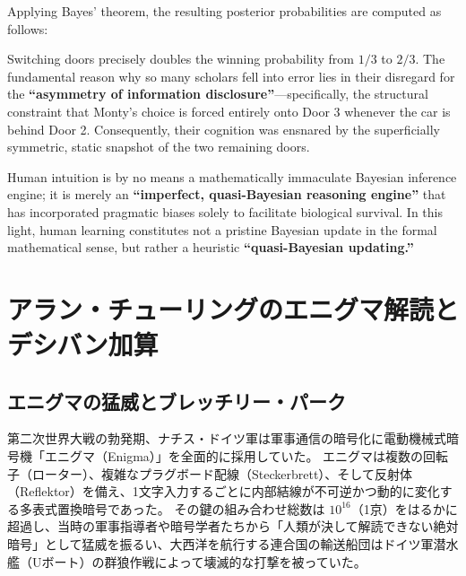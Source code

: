     

    Applying Bayes' theorem, the resulting posterior probabilities are computed as follows:

    

    Switching doors precisely doubles the winning probability from $1/3$ to $2/3$.
    The fundamental reason why so many scholars fell into error lies in their disregard for the \textbf{``asymmetry of information disclosure''}—specifically, the structural constraint that Monty's choice is forced entirely onto Door 3 whenever the car is behind Door 2. Consequently, their cognition was ensnared by the superficially symmetric, static snapshot of the two remaining doors.

    Human intuition is by no means a mathematically immaculate Bayesian inference engine; it is merely an \textbf{``imperfect, quasi-Bayesian reasoning engine''} that has incorporated pragmatic biases solely to facilitate biological survival. In this light, human learning constitutes not a pristine Bayesian update in the formal mathematical sense, but rather a heuristic \textbf{``quasi-Bayesian updating.''}
\fi


\ifja
    \section{アラン・チューリングのエニグマ解読とデシバン加算}

    \subsection{エニグマの猛威とブレッチリー・パーク}
    第二次世界大戦の勃発期、ナチス・ドイツ軍は軍事通信の暗号化に電動機械式暗号機「エニグマ（Enigma）」を全面的に採用していた。
    エニグマは複数の回転子（ローター）、複雑なプラグボード配線（Steckerbrett）、そして反射体（Reflektor）を備え、1文字入力するごとに内部結線が不可逆かつ動的に変化する多表式置換暗号であった。
    その鍵の組み合わせ総数は $10^{16}$（1京）をはるかに超過し、当時の軍事指導者や暗号学者たちから「人類が決して解読できない絶対暗号」として猛威を振るい、大西洋を航行する連合国の輸送船団はドイツ軍潜水艦（Uボート）の群狼作戦によって壊滅的な打撃を被っていた。


